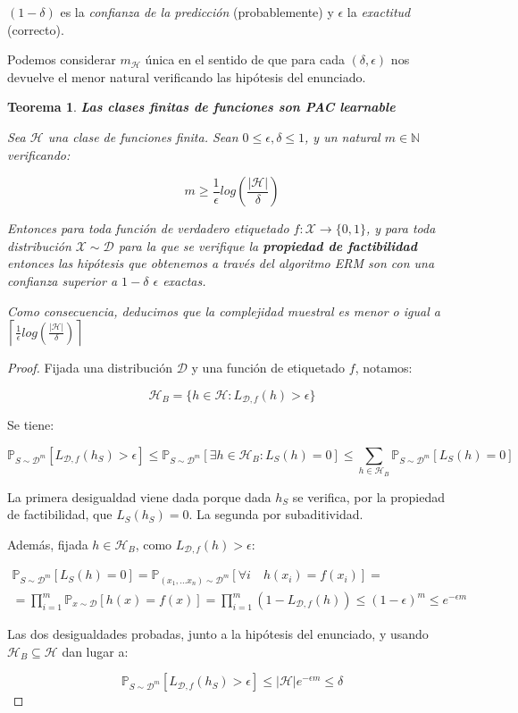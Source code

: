 \documentclass[11pt]{article}
\newtheorem{theorem}{Teorema}
\begin{document}
$(1-\delta)$ es la \emph{confianza de la predicción} (probablemente) y $\epsilon$ la \emph{exactitud} (correcto).

Podemos considerar $m_{\mathcal{H}}$ única en el sentido de que para cada $(\delta, \epsilon)$ nos devuelve el menor natural verificando las hipótesis del enunciado.

\begin{theorem}
\textbf{Las clases finitas de funciones son PAC learnable}

Sea $\mathcal{H}$ una clase de funciones finita. Sean $0 \le \epsilon, \delta \le 1$, y un natural $m\in \mathbb{N}$ verificando:

\[m \ge \frac{1}{\epsilon}log\left(\frac{|\mathcal{H}|}{\delta}\right)\]

Entonces para toda función de verdadero etiquetado $f: \mathcal{X}\rightarrow \{0,1\}$, y para toda distribución $\mathcal{X}\sim \mathcal{D}$ para la que se verifique la \textbf{propiedad de factibilidad} entonces las hipótesis que obtenemos a través del algoritmo ERM son con una confianza superior a $1-\delta$ $\epsilon$ exactas.

Como consecuencia, deducimos que la complejidad muestral es menor o igual a $\left\lceil \frac{1}{\epsilon}log \left(\frac{|\mathcal{H}|}{\delta} \right) \right\rceil$
\end{theorem}

\begin{proof}
Fijada una distribución $\mathcal{D}$ y una función de etiquetado $f$, notamos:

\[\mathcal{H}_B = \{h\in \mathcal{H}: L_{\mathcal{D},f}(h) > \epsilon\}\]

Se tiene:

\[\mathbb{P}_{S\sim \mathcal{D}^m}[L_{\mathcal{D},f}(h_S) > \epsilon] \le  \mathbb{P}_{S\sim \mathcal{D}^m}[\exists h\in \mathcal{H}_B : L_S(h) = 0] \le \sum_{h\in \mathcal{H}_B} \mathbb{P}_{S\sim \mathcal{D}^m}[L_S(h) = 0] \]

La primera desigualdad viene dada porque dada $h_S$ se verifica, por la propiedad de factibilidad, que $L_S(h_S)=0$. La segunda por subaditividad.

Además, fijada $h\in \mathcal{H}_B$, como $L_{\mathcal{D},f}(h) > \epsilon$:

\begin{align*}
\mathbb{P}_{S\sim \mathcal{D}^m}[L_S(h) = 0] = \mathbb{P}_{(x_1, \ldots x_n)\sim \mathcal{D}^m} [\forall i \quad h(x_i) = f(x_i)] =\\
= \prod_{i=1}^m \mathbb{P}_{x\sim \mathcal{D}}[h(x)=f(x)] = \prod_{i=1}^m (1 - L_{\mathcal{D},f}(h)) \le (1-\epsilon)^m \le e^{-\epsilon m}
\end{align*}


Las dos desigualdades probadas, junto a la hipótesis del enunciado, y usando $\mathcal{H}_B \subseteq \mathcal{H}$ dan lugar a:

\[\mathbb{P}_{S\sim \mathcal{D}^m}[L_{\mathcal{D},f}(h_S) > \epsilon] \le |\mathcal{H}|e^{-\epsilon m} \le \delta\]
\end{proof}
\end{document}
